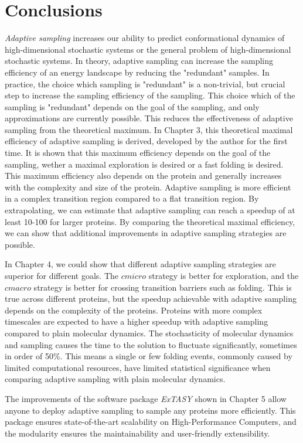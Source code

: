 \afterpage{\null\newpage}
\chapter{Conclusions}
\label{ch:conclude}
\emph{Adaptive sampling} increases our ability to predict conformational dynamics of high-dimensional stochastic systems or the general problem of high-dimensional stochastic systems. 
In theory, adaptive sampling can increase the sampling efficiency of an energy landscape by reducing the "redundant" samples. In practice, the choice which sampling is "redundant" is a non-trivial, but crucial step to increase the sampling efficiency of the sampling. This choice which of the sampling is "redundant" depends on the goal of the sampling, and only approximations are currently possible. This reduces the effectiveness of adaptive sampling from the theoretical maximum. 
In Chapter 3, this theoretical maximal efficiency of adaptive sampling is derived, developed by the author for the first time. It is shown that this maximum efficiency depends on the goal of the sampling, wether a maximal exploration is desired or a fast folding is desired. This maximum efficiency also depends on the protein and generally increases with the complexity and size of the protein. Adaptive sampling is more efficient in a complex transition region compared to a flat transition region. By extrapolating, we can estimate that adaptive sampling can reach a speedup of at least 10-100 for larger proteins. By comparing the theoretical maximal efficiency, we can show that additional improvements in adaptive sampling strategies are possible.

In Chapter 4, we could show that different adaptive sampling strategies are superior for different goals. The $cmicro$ strategy is better for exploration, and the $cmacro$ strategy is better for crossing transition barriers such as folding. This is true across different proteins, but the speedup achievable with adaptive sampling depends on the complexity of the proteins. Proteins with more complex timescales are expected to have a higher speedup with adaptive sampling compared to plain molecular dynamics. The stochasticity of molecular dynamics and sampling causes the time to the solution to fluctuate significantly, sometimes in order of 50\%. This means a single or few folding events, commonly caused by limited computational resources, have limited statistical significance when comparing adaptive sampling with plain molecular dynamics.

The improvements of the software package \emph{ExTASY} shown in Chapter 5 allow anyone to deploy adaptive sampling to sample any proteins more efficiently. This package ensures state-of-the-art scalability on High-Performance Computers, and the modularity ensures the maintainability and user-friendly extensibility.

